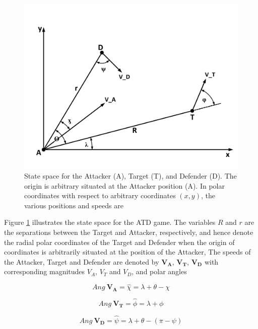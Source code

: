 \begin{figure}[H]
	\centering
	\includegraphics[width=1.0\textwidth]{fig/fig7-1.pdf}
	\caption{State space for the Attacker (A), Target (T), and Defender (D). The origin is arbitrary situated at the Attacker position (A). In polar coordinates with respect to arbitrary coordinates $(x,y)$, the various positions and speeds are}
	\label{7.1}
\end{figure}

Figure \ref{7.1} illustrates the state space for the ATD game. The variables $R$ and $r$ are the separations between the Target and Attacker, respectively, and hence denote the radial polar coordinates of the Target and Defender when the origin of coordinates is arbitrarily situated at the position of the Attacker, The speeds of the Attacker, Target and Defender are denoted by $\boldsymbol{V_A}$, $\boldsymbol{V_T}$, $\boldsymbol{V_D}$ with corresponding magnitudes $V_A$, $V_T$ and $V_D$, and polar angles 

\begin{equation}
	Ang\ \boldsymbol{V_A} = \hat{\chi} = \lambda+\theta-\chi
\end{equation}

\begin{equation}
Ang\ \boldsymbol{V_T} = \hat{\phi} = \lambda+\phi
\end{equation}

\begin{equation}
Ang\ \boldsymbol{V_D} = \hat{\psi} = \lambda+\theta-(\pi - \psi)
\end{equation}



